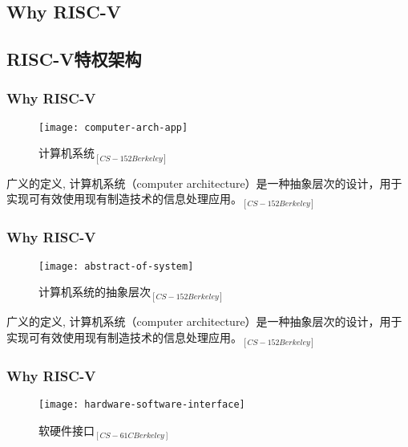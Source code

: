 \subsection{Why RISC-V} %
\subsection{RISC-V特权架构}

\begin{frame}
	
	\frametitle{Why RISC-V}
	
	\begin{figure}
		\centering
		\texttt{[image: computer-arch-app]}
		\caption{计算机系统$_{[CS-152 Berkeley]}$}
	\end{figure}
	
	广义的定义, 计算机系统（computer architecture）是一种抽象层次的设计，用于实现可有效使用现有制造技术的信息处理应用。$_{[CS-152 Berkeley]}$
\end{frame}


\begin{frame}
	
	\frametitle{Why RISC-V}
	
	\begin{figure}
		\centering
		\texttt{[image: abstract-of-system]}
		\caption{计算机系统的抽象层次$ _{[CS-152 Berkeley]} $}
	\end{figure}
	
	广义的定义, 计算机系统（computer architecture）是一种抽象层次的设计，用于实现可有效使用现有制造技术的信息处理应用。$_{[CS-152 Berkeley]}$
	
\end{frame}

\begin{frame}[plain]
	
	\frametitle{Why RISC-V}
	\begin{figure}
		\centering
		\texttt{[image: hardware-software-interface]}
		\caption{软硬件接口$ _{[CS-61C Berkeley]} $}
	\end{figure}
	
	
\end{frame}


